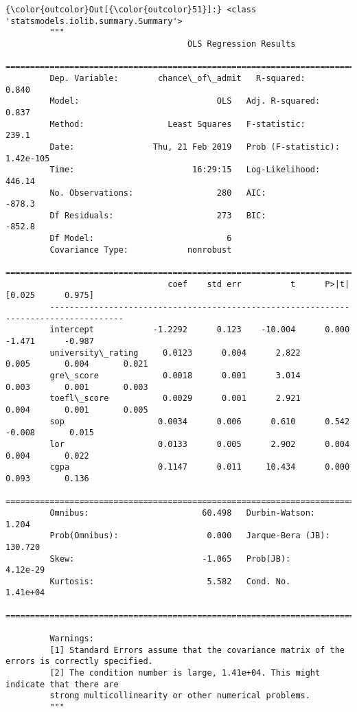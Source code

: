 \documentclass[11pt]{article}
\begin{document}
\begin{Verbatim}[commandchars=\\\{\}]
{\color{outcolor}Out[{\color{outcolor}51}]:} <class 'statsmodels.iolib.summary.Summary'>
         """
                                     OLS Regression Results                            
         ==============================================================================
         Dep. Variable:        chance\_of\_admit   R-squared:                       0.840
         Model:                            OLS   Adj. R-squared:                  0.837
         Method:                 Least Squares   F-statistic:                     239.1
         Date:                Thu, 21 Feb 2019   Prob (F-statistic):          1.42e-105
         Time:                        16:29:15   Log-Likelihood:                 446.14
         No. Observations:                 280   AIC:                            -878.3
         Df Residuals:                     273   BIC:                            -852.8
         Df Model:                           6                                         
         Covariance Type:            nonrobust                                         
         =====================================================================================
                                 coef    std err          t      P>|t|      [0.025      0.975]
         -------------------------------------------------------------------------------------
         intercept            -1.2292      0.123    -10.004      0.000      -1.471      -0.987
         university\_rating     0.0123      0.004      2.822      0.005       0.004       0.021
         gre\_score             0.0018      0.001      3.014      0.003       0.001       0.003
         toefl\_score           0.0029      0.001      2.921      0.004       0.001       0.005
         sop                   0.0034      0.006      0.610      0.542      -0.008       0.015
         lor                   0.0133      0.005      2.902      0.004       0.004       0.022
         cgpa                  0.1147      0.011     10.434      0.000       0.093       0.136
         ==============================================================================
         Omnibus:                       60.498   Durbin-Watson:                   1.204
         Prob(Omnibus):                  0.000   Jarque-Bera (JB):              130.720
         Skew:                          -1.065   Prob(JB):                     4.12e-29
         Kurtosis:                       5.582   Cond. No.                     1.41e+04
         ==============================================================================
         
         Warnings:
         [1] Standard Errors assume that the covariance matrix of the errors is correctly specified.
         [2] The condition number is large, 1.41e+04. This might indicate that there are
         strong multicollinearity or other numerical problems.
         """
\end{Verbatim}
            
\end{document}
